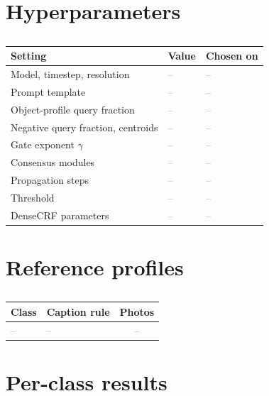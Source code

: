 \documentclass[runningheads]{llncs}
\newcommand{\x}{\textcolor{gray}{--}}          %
\begin{document}
\section{Hyperparameters}
\label{sec:s-hparams}

\begin{table}[h]
\centering
\caption{}
\label{tab:s-hparams}
\footnotesize
\begin{tabular}{@{}lll@{}}
\toprule
Setting & Value & Chosen on \\
\midrule
Model, timestep, resolution        & \x & \x \\
Prompt template                    & \x & \x \\
Object-profile query fraction      & \x & \x \\
Negative query fraction, centroids & \x & \x \\
Gate exponent $\gamma$             & \x & \x \\
Consensus modules                  & \x & \x \\
Propagation steps                  & \x & \x \\
Threshold                          & \x & \x \\
DenseCRF parameters                & \x & \x \\
\bottomrule
\end{tabular}
\end{table}

\section{Reference profiles}
\label{sec:s-profiles}

\begin{table}[h]
\centering
\caption{}
\label{tab:s-profiles}
\footnotesize
\begin{tabular}{@{}llc@{}}
\toprule
Class & Caption rule & Photos \\
\midrule
\x & \x & \x \\
\bottomrule
\end{tabular}
\end{table}

\section{Per-class results}
\label{sec:s-perclass}
\end{document}
